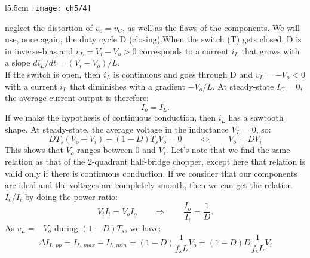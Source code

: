 		\begin{wrapfigure}[9]{l}{5.5cm}
		\vspace{0mm}
		\texttt{[image: ch5/4]}
		\end{wrapfigure}	
		neglect the distortion of $v_o = v_C$, as well as the flaws of the components. We will use, once again, the duty cycle D (closing).When the switch (T) gets closed, D is in inverse-bias and $v_L = V_i - V_o>0$ corresponds to a current $i_L$ that grows with a slope $di_L/dt = (V_i -V_o)/L$.  \\
		
		If the switch is open, then $i_L$ is continuous and goes through D and $v_L = -V_o<0$ with a current $i_L$ that diminishes with a gradient $-V_o/L$. At steady-state $I_C = 0$, the average current output is therefore: 
		\begin{equation}
			I_o = I_L.
		\end{equation}
		If we make the hypothesis of continuous conduction, then $i_L$ has a sawtooth shape. At steady-state, the average voltage in the inductance $V_L = 0$, so:
		\begin{equation}
			DT_s(V_o-V_i) - (1-D)T_sV_o = 0 \qquad \Leftrightarrow \qquad V_o = DV_i
			\label{eq:5.2}
		\end{equation}
		This shows that $V_o$ ranges between 0 and $V_i$. Let's note that we find the same relation as that of the 2-quadrant half-bridge chopper, except here that relation is valid only if there is continuous conduction. If we consider that our components are ideal and the voltages are completely smooth, then we can get the relation $I_o/I_i$ by doing the power ratio:
		\begin{equation}
			V_iI_i = V_oI_o \qquad \Rightarrow \qquad \frac{I_o}{I_i}=\frac{1}{D}.
		\end{equation}		 
		As $v_L=  -V_o$ during $(1-D)T_s$, we have:
		\begin{equation}
			\Delta I_{L,pp} = I_{L,max}-I_{L,min} = (1-D)\frac{1}{f_sL}V_o = (1-D)D\frac{1}{f_sL}V_i
			\label{eq:5.4}
		\end{equation}
		
